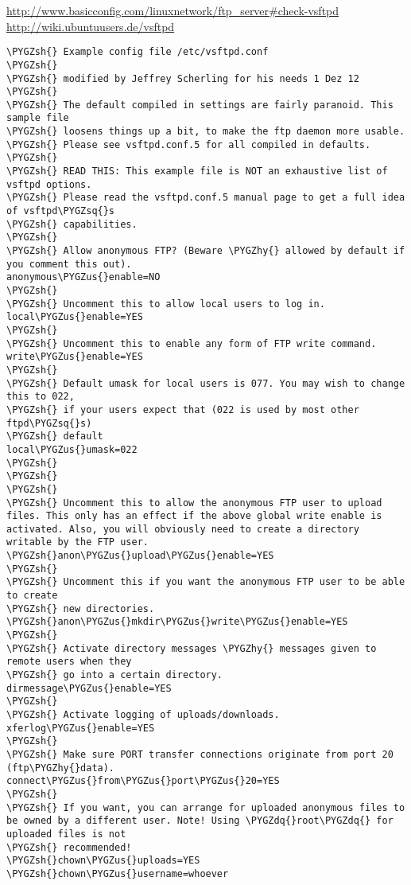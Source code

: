 \documentclass[letterpaper,10pt,english]{sphinxmanual}
\def\PYGZus{\char`\_}
\def\PYGZsh{\char`\#}
\def\PYGZhy{\char`\-}
\def\PYGZsq{\char`\'}
\def\PYGZdq{\char`\"}
\begin{document}
\href{http://www.basicconfig.com/linuxnetwork/ftp\_server\#check-vsftpd}{http://www.basicconfig.com/linuxnetwork/ftp\_server\#check-vsftpd}
\href{http://wiki.ubuntuusers.de/vsftpd}{http://wiki.ubuntuusers.de/vsftpd}

\begin{Verbatim}[commandchars=\\\{\}]
\PYGZsh{} Example config file /etc/vsftpd.conf
\PYGZsh{}
\PYGZsh{} modified by Jeffrey Scherling for his needs 1 Dez 12
\PYGZsh{}
\PYGZsh{} The default compiled in settings are fairly paranoid. This sample file
\PYGZsh{} loosens things up a bit, to make the ftp daemon more usable.
\PYGZsh{} Please see vsftpd.conf.5 for all compiled in defaults.
\PYGZsh{}
\PYGZsh{} READ THIS: This example file is NOT an exhaustive list of vsftpd options.
\PYGZsh{} Please read the vsftpd.conf.5 manual page to get a full idea of vsftpd\PYGZsq{}s
\PYGZsh{} capabilities.
\PYGZsh{}
\PYGZsh{} Allow anonymous FTP? (Beware \PYGZhy{} allowed by default if you comment this out).
anonymous\PYGZus{}enable=NO
\PYGZsh{}
\PYGZsh{} Uncomment this to allow local users to log in.
local\PYGZus{}enable=YES
\PYGZsh{}
\PYGZsh{} Uncomment this to enable any form of FTP write command.
write\PYGZus{}enable=YES
\PYGZsh{}
\PYGZsh{} Default umask for local users is 077. You may wish to change this to 022,
\PYGZsh{} if your users expect that (022 is used by most other ftpd\PYGZsq{}s)
\PYGZsh{} default
local\PYGZus{}umask=022
\PYGZsh{}
\PYGZsh{}
\PYGZsh{}
\PYGZsh{} Uncomment this to allow the anonymous FTP user to upload files. This only has an effect if the above global write enable is activated. Also, you will obviously need to create a directory writable by the FTP user.
\PYGZsh{}anon\PYGZus{}upload\PYGZus{}enable=YES
\PYGZsh{}
\PYGZsh{} Uncomment this if you want the anonymous FTP user to be able to create
\PYGZsh{} new directories.
\PYGZsh{}anon\PYGZus{}mkdir\PYGZus{}write\PYGZus{}enable=YES
\PYGZsh{}
\PYGZsh{} Activate directory messages \PYGZhy{} messages given to remote users when they
\PYGZsh{} go into a certain directory.
dirmessage\PYGZus{}enable=YES
\PYGZsh{}
\PYGZsh{} Activate logging of uploads/downloads.
xferlog\PYGZus{}enable=YES
\PYGZsh{}
\PYGZsh{} Make sure PORT transfer connections originate from port 20 (ftp\PYGZhy{}data).
connect\PYGZus{}from\PYGZus{}port\PYGZus{}20=YES
\PYGZsh{}
\PYGZsh{} If you want, you can arrange for uploaded anonymous files to be owned by a different user. Note! Using \PYGZdq{}root\PYGZdq{} for uploaded files is not
\PYGZsh{} recommended!
\PYGZsh{}chown\PYGZus{}uploads=YES
\PYGZsh{}chown\PYGZus{}username=whoever

\end{Verbatim}
\end{document}
